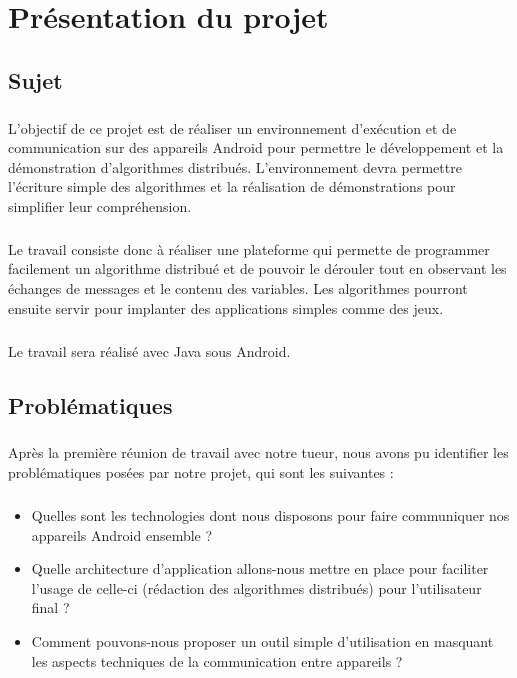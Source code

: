 \documentclass[a4paper,10pt]{report}
\begin{document}
\chapter{Présentation du projet}
  \section{Sujet}
  \paragraph{}
  L’objectif de ce projet est de réaliser un environnement d’exécution et de communication
  sur des appareils Android pour permettre le développement et la démonstration
  d’algorithmes distribués. L’environnement devra permettre l'écriture simple des algorithmes
  et la réalisation de démonstrations pour simplifier leur compréhension.
  \paragraph{}
  Le travail consiste donc à réaliser une plateforme qui permette de programmer facilement un algorithme
  distribué et de pouvoir le dérouler tout en observant les échanges de messages et
  le contenu des variables.
  Les algorithmes pourront ensuite servir pour implanter des applications simples comme
  des jeux. 
  \paragraph{}
  Le travail sera réalisé avec Java sous Android.
  
  \section{Problématiques}
  \paragraph{}
  Après la première réunion de travail avec notre tueur, nous avons pu identifier les problématiques posées par notre projet, qui sont les suivantes :
\paragraph{}
  \begin{itemize}
    \item Quelles sont les technologies dont nous disposons pour faire communiquer nos appareils Android ensemble ?
    \newline
    \item Quelle architecture d'application allons-nous mettre en place pour faciliter l'usage de celle-ci (rédaction des algorithmes distribués) pour l'utilisateur final ?
    \newline
    \item Comment pouvons-nous proposer un outil simple d'utilisation en masquant les aspects techniques de la communication entre appareils ?
  \end{itemize}
  
\end{document}
